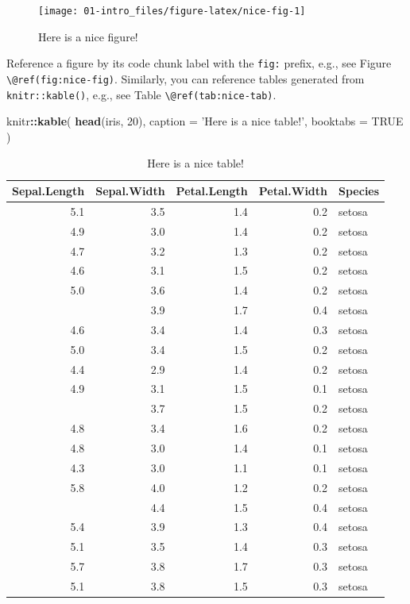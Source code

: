 \documentclass[
]{book}
\newenvironment{Shaded}{\begin{snugshade}}{\end{snugshade}}
\newcommand{\DataTypeTok}[1]{\textcolor[rgb]{0.13,0.29,0.53}{#1}}
\newcommand{\DecValTok}[1]{\textcolor[rgb]{0.00,0.00,0.81}{#1}}
\newcommand{\KeywordTok}[1]{\textcolor[rgb]{0.13,0.29,0.53}{\textbf{#1}}}
\newcommand{\NormalTok}[1]{#1}
\newcommand{\OperatorTok}[1]{\textcolor[rgb]{0.81,0.36,0.00}{\textbf{#1}}}
\newcommand{\OtherTok}[1]{\textcolor[rgb]{0.56,0.35,0.01}{#1}}
\newcommand{\StringTok}[1]{\textcolor[rgb]{0.31,0.60,0.02}{#1}}
\begin{document}
\begin{figure}

{\centering \texttt{[image: 01-intro\_files/figure-latex/nice-fig-1]} 

}

\caption{Here is a nice figure!}\label{fig:nice-fig}
\end{figure}

Reference a figure by its code chunk label with the \texttt{fig:} prefix, e.g., see Figure \texttt{\textbackslash{}@ref(fig:nice-fig)}. Similarly, you can reference tables generated from \texttt{knitr::kable()}, e.g., see Table \texttt{\textbackslash{}@ref(tab:nice-tab)}.

\begin{Shaded}
\begin{Highlighting}[]
\NormalTok{knitr}\OperatorTok{::}\KeywordTok{kable}\NormalTok{(}
  \KeywordTok{head}\NormalTok{(iris, }\DecValTok{20}\NormalTok{), }\DataTypeTok{caption =} \StringTok{'Here is a nice table!'}\NormalTok{,}
  \DataTypeTok{booktabs =} \OtherTok{TRUE}
\NormalTok{)}
\end{Highlighting}
\end{Shaded}

\begin{table}

\caption{\label{tab:nice-tab}Here is a nice table!}
\centering
\begin{tabular}[t]{rrrrl}
\toprule
Sepal.Length & Sepal.Width & Petal.Length & Petal.Width & Species\\
\midrule
5.1 & 3.5 & 1.4 & 0.2 & setosa\\
4.9 & 3.0 & 1.4 & 0.2 & setosa\\
4.7 & 3.2 & 1.3 & 0.2 & setosa\\
4.6 & 3.1 & 1.5 & 0.2 & setosa\\
5.0 & 3.6 & 1.4 & 0.2 & setosa\\
\addlinespace
5.4 & 3.9 & 1.7 & 0.4 & setosa\\
4.6 & 3.4 & 1.4 & 0.3 & setosa\\
5.0 & 3.4 & 1.5 & 0.2 & setosa\\
4.4 & 2.9 & 1.4 & 0.2 & setosa\\
4.9 & 3.1 & 1.5 & 0.1 & setosa\\
\addlinespace
5.4 & 3.7 & 1.5 & 0.2 & setosa\\
4.8 & 3.4 & 1.6 & 0.2 & setosa\\
4.8 & 3.0 & 1.4 & 0.1 & setosa\\
4.3 & 3.0 & 1.1 & 0.1 & setosa\\
5.8 & 4.0 & 1.2 & 0.2 & setosa\\
\addlinespace
5.7 & 4.4 & 1.5 & 0.4 & setosa\\
5.4 & 3.9 & 1.3 & 0.4 & setosa\\
5.1 & 3.5 & 1.4 & 0.3 & setosa\\
5.7 & 3.8 & 1.7 & 0.3 & setosa\\
5.1 & 3.8 & 1.5 & 0.3 & setosa\\
\bottomrule
\end{tabular}
\end{table}
\end{document}
